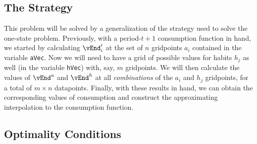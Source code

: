 \documentclass[titlepage]{\econtex}
\begin{document}
{  \hypertarget{The-Strategy}{}
  \subsection{The Strategy}

  This problem will be solved by a generalization of the strategy used
  to solve the one-state problem.  Previously, with a period-$t+1$
  consumption function in hand, we started by calculating
  $\vEnd^{\prime}_{i}$ at the set of $n$ gridpoints ${a}_{i}$
  contained in the variable \texttt{aVec}.  Now we will need to
  have a grid of possible values for habits $h_{j}$ as well (in the
  variable \texttt{hVec}) with, say, $m$ gridpoints.  We will then
  calculate the values of $\vEnd^{{a}}$ and $\vEnd^{h}$
  at all \textit{combinations} of the ${a}_{i}$ and $h_{j}$
  gridpoints, for a total of $m \times n$ datapoints.  Finally, with
  these results in hand, we can obtain the corresponding values of
  consumption and construct the approximating interpolation to the
  consumption function.

  \hypertarget{Optimality-Conditions}{}
  \subsection{Optimality Conditions}
  \hypertarget{The-First-Orrder-Condition-for-c}{}
}
\end{document}
